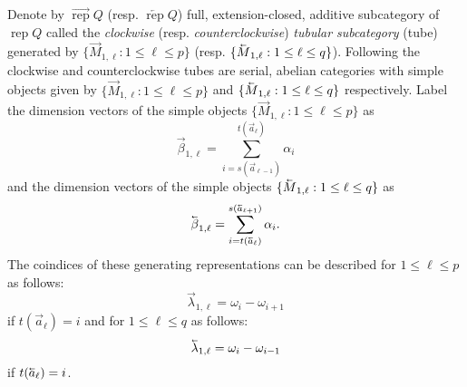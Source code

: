 \documentclass[11pt]{amsart}
\newcommand{\rep}{\operatorname{rep}}
\newcommand{\cev}[1]{\reflectbox{\!\ensuremath{\vec{\,\reflectbox{\ensuremath{#1}}}}}}
\newcommand{\scev}[1]{\reflectbox{\scriptsize\!\ensuremath{\vec{\,\reflectbox{\ensuremath{#1}}}}}}
\numberwithin{equation}{section}
\begin{document}
  Denote by $\overrightarrow{\rep}Q$ (resp. $\overleftarrow{\rep}Q$) full, extension-closed, additive subcategory of $\rep Q$ called the \emph{clockwise} (resp. \emph{counterclockwise}) \emph{tubular subcategory} (tube) generated by $\{\vec{M}_{1,\ell}:1\le\ell\le p\}$ (resp. $\{\cev{M}_{1,\ell}:1\le\ell\le q\}$).  Following \cite[Section 3.1]{Rin84} the clockwise and counterclockwise tubes are serial, abelian categories with simple objects given by $\{\vec{M}_{1,\ell}:1\le\ell\le p\}$ and $\{\cev{M}_{1,\ell}:1\le\ell\le q\}$ respectively.  Label the dimension vectors of the simple objects $\{\vec{M}_{1,\ell}:1\le\ell\le p\}$ as
  \begin{equation}
    \vec{\beta}_{1,\ell}=\sum_{i=s(\vec{a}_{\ell-1})}^{t(\vec{a}_\ell)}\alpha_i
  \end{equation}
  and the dimension vectors of the simple objects $\{\cev{M}_{1,\ell}:1\le\ell\le q\}$ as
  \begin{equation}
    \cev{\beta}_{1,\ell}=\sum_{i=t(\scev{a}_\ell)}^{s(\scev{a}_{\ell+1})}\alpha_i.
  \end{equation}
  The coindices of these generating representations can be described for $1\le\ell\le p$ as follows:
  \begin{equation}
    \vec{\lambda}_{1,\ell}=\omega_i-\omega_{i+1}
  \end{equation}
  if $t(\vec{a}_\ell)=i$ and for $1\le\ell\le q$ as follows:
  \begin{equation}
    \cev{\lambda}_{1,\ell}=\omega_i-\omega_{i-1}
  \end{equation}
  if $t(\cev{a}_\ell)=i$.
\end{document}
